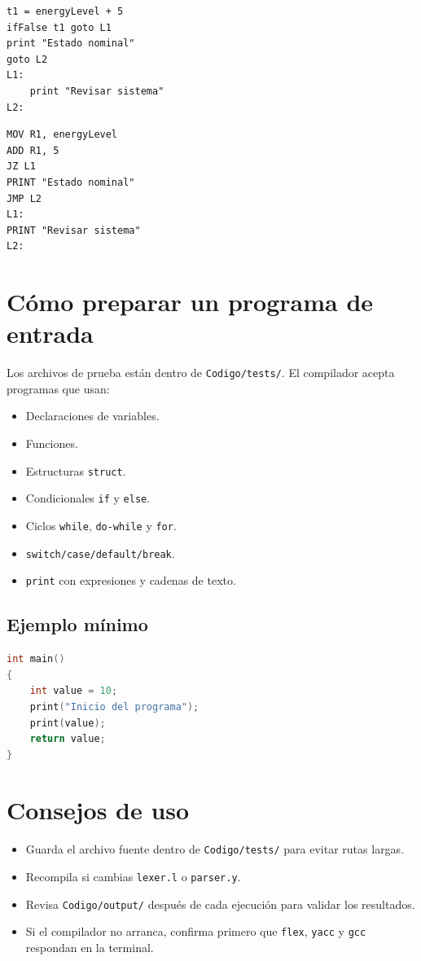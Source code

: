 \documentclass[12pt]{article}
\begin{document}
\begin{lstlisting}[language={}, caption={Ejemplo de código intermedio}]
t1 = energyLevel + 5
ifFalse t1 goto L1
print "Estado nominal"
goto L2
L1:
    print "Revisar sistema"
L2:
\end{lstlisting}

\begin{lstlisting}[language={}, caption={Ejemplo de código final}]
MOV R1, energyLevel
ADD R1, 5
JZ L1
PRINT "Estado nominal"
JMP L2
L1:
PRINT "Revisar sistema"
L2:
\end{lstlisting}

\section{Cómo preparar un programa de entrada}
Los archivos de prueba están dentro de \texttt{Codigo/tests/}. El compilador acepta programas que usan:
\begin{itemize}[label={-}]
    \item Declaraciones de variables.
    \item Funciones.
    \item Estructuras \texttt{struct}.
    \item Condicionales \texttt{if} y \texttt{else}.
    \item Ciclos \texttt{while}, \texttt{do-while} y \texttt{for}.
    \item \texttt{switch/case/default/break}.
    \item \texttt{print} con expresiones y cadenas de texto.
\end{itemize}

\subsection{Ejemplo mínimo}
\begin{lstlisting}[language=C, caption={Programa de entrada mínimo}]
int main()
{
    int value = 10;
    print("Inicio del programa");
    print(value);
    return value;
}
\end{lstlisting}

\section{Consejos de uso}
\begin{itemize}[label={-}]
    \item Guarda el archivo fuente dentro de \texttt{Codigo/tests/} para evitar rutas largas.
    \item Recompila si cambias \texttt{lexer.l} o \texttt{parser.y}.
    \item Revisa \texttt{Codigo/output/} después de cada ejecución para validar los resultados.
    \item Si el compilador no arranca, confirma primero que \texttt{flex}, \texttt{yacc} y \texttt{gcc} respondan en la terminal.
\end{itemize}
\end{document}

